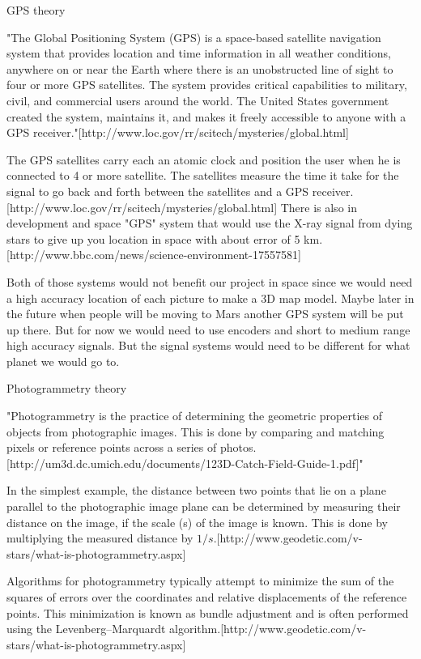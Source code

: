 GPS theory

"The Global Positioning System (GPS) is a space-based satellite navigation system that provides location and time information in all weather conditions, anywhere on or near the Earth where there is an unobstructed line of sight to four or more GPS satellites. The system provides critical capabilities to military, civil, and commercial users around the world. The United States government created the system, maintains it, and makes it freely accessible to anyone with a GPS receiver."[http://www.loc.gov/rr/scitech/mysteries/global.html]

The GPS satellites carry each an atomic clock and position the user when he is connected to 4 or more satellite. The satellites measure the time it take for the signal to go back and forth between the satellites and a GPS receiver.[http://www.loc.gov/rr/scitech/mysteries/global.html] There is also in development and space "GPS" system that would use the X-ray signal from dying stars to give up you location in space with about error of 5 km.[http://www.bbc.com/news/science-environment-17557581]

Both of those systems would not benefit our project in space since we would need a high accuracy location of each picture to make a 3D map model. Maybe later in the future when people will be moving to Mars another GPS system will be put up there. But for now we would need to use encoders and short to medium range high accuracy signals. But the signal systems would need to be different for what planet we would go to. 

Photogrammetry theory

"Photogrammetry is the practice of determining the geometric properties of objects from
photographic images. This is done by comparing and matching pixels or reference points across a series
of photos.[http://um3d.dc.umich.edu/documents/123D-Catch-Field-Guide-1.pdf]"


In the simplest example, the distance between two points that lie on a plane parallel to the photographic image plane can be determined by measuring their distance on the image, if the scale (s) of the image is known. This is done by multiplying the measured distance by $1/s$.[http://www.geodetic.com/v-stars/what-is-photogrammetry.aspx]

Algorithms for photogrammetry typically attempt to minimize the sum of the squares of errors over the coordinates and relative displacements of the reference points. This minimization is known as bundle adjustment and is often performed using the Levenberg–Marquardt algorithm.[http://www.geodetic.com/v-stars/what-is-photogrammetry.aspx]

